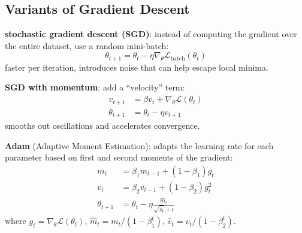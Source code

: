 \documentclass[11pt,a4paper]{article}
\theoremstyle{definition}
\theoremstyle{remark}
\begin{document}
\begin{center}
\end{center}

\subsection{Variants of Gradient Descent}

\textbf{stochastic gradient descent (SGD)}: instead of computing the gradient over the entire dataset, use a random mini-batch:
\[
\theta_{t+1} = \theta_t - \eta \nabla_\theta \mathcal{L}_{\text{batch}}(\theta_t)
\]
faster per iteration, introduces noise that can help escape local minima.

\textbf{SGD with momentum}: add a ``velocity'' term:
\begin{align}
v_{t+1} &= \beta v_t + \nabla_\theta \mathcal{L}(\theta_t) \\
\theta_{t+1} &= \theta_t - \eta v_{t+1}
\end{align}
smooths out oscillations and accelerates convergence.

\textbf{Adam} (Adaptive Moment Estimation): adapts the learning rate for each parameter based on first and second moments of the gradient:
\begin{align}
m_t &= \beta_1 m_{t-1} + (1-\beta_1) g_t \\
v_t &= \beta_2 v_{t-1} + (1-\beta_2) g_t^2 \\
\theta_{t+1} &= \theta_t - \eta \frac{\hat{m}_t}{\sqrt{\hat{v}_t} + \epsilon}
\end{align}
where $g_t = \nabla_\theta \mathcal{L}(\theta_t)$, $\hat{m}_t = m_t/(1-\beta_1^t)$, $\hat{v}_t = v_t/(1-\beta_2^t)$.
\end{document}
